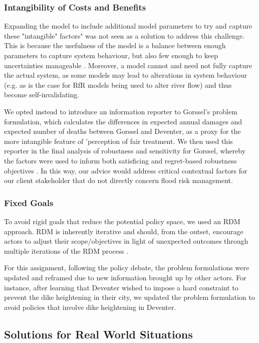 \subsubsection{Intangibility of Costs and Benefits} Expanding the model to include additional model parameters to try and capture these "intangible" factors" was not seen as a solution to address this challenge. This is because the usefulness of the model is a balance between enough parameters to capture system behaviour, but also few enough to keep uncertainties manageable \parencite{saltelli_five_2020}. Moreover, a model cannot and need not fully capture the actual system, as some models may lead to alterations in system behaviour (e.g. as is the case for RfR models being used to alter river flow) and thus become self-invalidating.

We opted instead to introduce an information reporter to Gorssel's problem formulation, which calculates the differences in expected annual damages and expected number of deaths between Gorssel and Deventer, as a proxy for the more intangible feature of 'perception of fair treatment. We then used this reporter in the final analysis of robustness and sensitivity for Gorssel, whereby the factors were used to inform both satisficing and regret-based robustness objectives \parencite{mcphail_robustness_2018}. In this way, our advice would address critical contextual factors for our client stakeholder that do not directly concern flood risk management. 

\subsubsection{Fixed Goals} To avoid rigid goals that reduce the potential policy space, we used an RDM approach. RDM is inherently iterative and should, from the outset, encourage actors to adjust their scope/objectives in light of unexpected outcomes through multiple iterations of the RDM process \parencite{lempert_general_2006}. 

For this assignment, following the policy debate, the problem formulations were updated and reframed due to new information brought up by other actors. For instance, after learning that Deventer wished to impose a hard constraint to prevent the dike heightening in their city, we updated the problem formulation to avoid policies that involve dike heightening in Deventer. 

\subsection{Solutions for Real World Situations }

